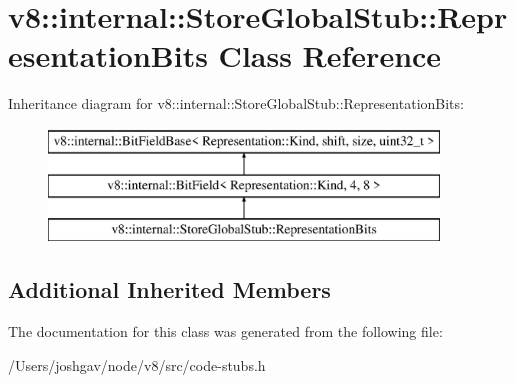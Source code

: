 \hypertarget{classv8_1_1internal_1_1_store_global_stub_1_1_representation_bits}{}\section{v8\+:\+:internal\+:\+:Store\+Global\+Stub\+:\+:Representation\+Bits Class Reference}
\label{classv8_1_1internal_1_1_store_global_stub_1_1_representation_bits}
Inheritance diagram for v8\+:\+:internal\+:\+:Store\+Global\+Stub\+:\+:Representation\+Bits\+:\begin{figure}[H]
\begin{center}
\leavevmode
\includegraphics[height=3.000000cm]{classv8_1_1internal_1_1_store_global_stub_1_1_representation_bits}
\end{center}
\end{figure}
\subsection*{Additional Inherited Members}


The documentation for this class was generated from the following file\+:\begin{DoxyCompactItemize}
\item 
/\+Users/joshgav/node/v8/src/code-\/stubs.\+h\end{DoxyCompactItemize}
